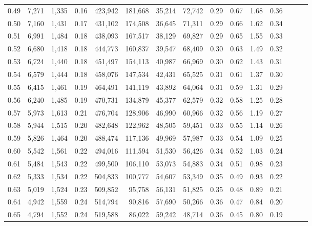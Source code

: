 \begin{tabular}{rrrrrrrrrrrrrrr}
0.49 &   7,271 &  1,335 &  0.16 &  423,942 &  181,668 &   35,214 &   72,742 &  0.29 &  0.67 &  1.68 &      0.36 \\
0.50 &   7,160 &  1,431 &  0.17 &  431,102 &  174,508 &   36,645 &   71,311 &  0.29 &  0.66 &  1.62 &      0.34 \\
0.51 &   6,991 &  1,484 &  0.18 &  438,093 &  167,517 &   38,129 &   69,827 &  0.29 &  0.65 &  1.55 &      0.33 \\
0.52 &   6,680 &  1,418 &  0.18 &  444,773 &  160,837 &   39,547 &   68,409 &  0.30 &  0.63 &  1.49 &      0.32 \\
0.53 &   6,724 &  1,440 &  0.18 &  451,497 &  154,113 &   40,987 &   66,969 &  0.30 &  0.62 &  1.43 &      0.31 \\
0.54 &   6,579 &  1,444 &  0.18 &  458,076 &  147,534 &   42,431 &   65,525 &  0.31 &  0.61 &  1.37 &      0.30 \\
0.55 &   6,415 &  1,461 &  0.19 &  464,491 &  141,119 &   43,892 &   64,064 &  0.31 &  0.59 &  1.31 &      0.29 \\
0.56 &   6,240 &  1,485 &  0.19 &  470,731 &  134,879 &   45,377 &   62,579 &  0.32 &  0.58 &  1.25 &      0.28 \\
0.57 &   5,973 &  1,613 &  0.21 &  476,704 &  128,906 &   46,990 &   60,966 &  0.32 &  0.56 &  1.19 &      0.27 \\
0.58 &   5,944 &  1,515 &  0.20 &  482,648 &  122,962 &   48,505 &   59,451 &  0.33 &  0.55 &  1.14 &      0.26 \\
0.59 &   5,826 &  1,464 &  0.20 &  488,474 &  117,136 &   49,969 &   57,987 &  0.33 &  0.54 &  1.09 &      0.25 \\
0.60 &   5,542 &  1,561 &  0.22 &  494,016 &  111,594 &   51,530 &   56,426 &  0.34 &  0.52 &  1.03 &      0.24 \\
0.61 &   5,484 &  1,543 &  0.22 &  499,500 &  106,110 &   53,073 &   54,883 &  0.34 &  0.51 &  0.98 &      0.23 \\
0.62 &   5,333 &  1,534 &  0.22 &  504,833 &  100,777 &   54,607 &   53,349 &  0.35 &  0.49 &  0.93 &      0.22 \\
0.63 &   5,019 &  1,524 &  0.23 &  509,852 &   95,758 &   56,131 &   51,825 &  0.35 &  0.48 &  0.89 &      0.21 \\
0.64 &   4,942 &  1,559 &  0.24 &  514,794 &   90,816 &   57,690 &   50,266 &  0.36 &  0.47 &  0.84 &      0.20 \\
0.65 &   4,794 &  1,552 &  0.24 &  519,588 &   86,022 &   59,242 &   48,714 &  0.36 &  0.45 &  0.80 &      0.19 \\

\end{tabular}
